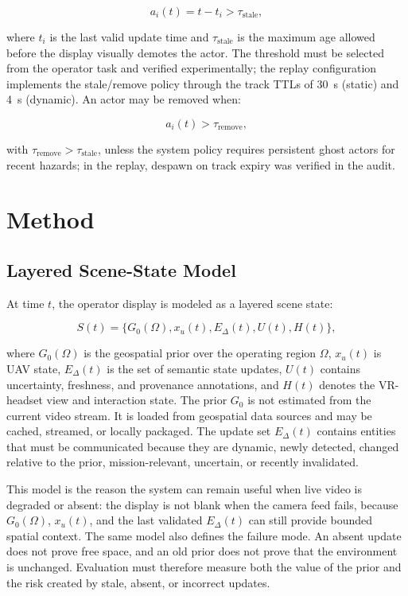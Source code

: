 \documentclass[fleqn]{VRIH2025}
\begin{document}
\begin{equation}
a_i(t) = t - t_i > \tau_{\mathrm{stale}},
\label{eq:stale}
\end{equation}

where \(t_i\) is the last valid update time and \(\tau_{\mathrm{stale}}\) is the maximum age allowed before the display visually demotes the actor. The threshold must be selected from the operator task and verified experimentally; the replay configuration implements the stale/remove policy through the track TTLs of 30~s (static) and 4~s (dynamic). An actor may be removed when:

\begin{equation}
a_i(t) > \tau_{\mathrm{remove}},
\label{eq:remove}
\end{equation}

with \(\tau_{\mathrm{remove}} > \tau_{\mathrm{stale}}\), unless the system policy requires persistent ghost actors for recent hazards; in the replay, despawn on track expiry was verified in the audit.

\section{Method}

\subsection{Layered Scene-State Model}

At time \(t\), the operator display is modeled as a layered scene state:

\begin{equation}
S(t) = \{G_0(\Omega), x_u(t), E_{\Delta}(t), U(t), H(t)\},
\label{eq:scene-state}
\end{equation}

where \(G_0(\Omega)\) is the geospatial prior over the operating region \(\Omega\), \(x_u(t)\) is UAV state, \(E_{\Delta}(t)\) is the set of semantic state updates, \(U(t)\) contains uncertainty, freshness, and provenance annotations, and \(H(t)\) denotes the VR-headset view and interaction state. The prior \(G_0\) is not estimated from the current video stream. It is loaded from geospatial data sources and may be cached, streamed, or locally packaged. The update set \(E_{\Delta}(t)\) contains entities that must be communicated because they are dynamic, newly detected, changed relative to the prior, mission-relevant, uncertain, or recently invalidated.

This model is the reason the system can remain useful when live video is degraded or absent: the display is not blank when the camera feed fails, because \(G_0(\Omega)\), \(x_u(t)\), and the last validated \(E_{\Delta}(t)\) can still provide bounded spatial context. The same model also defines the failure mode. An absent update does not prove free space, and an old prior does not prove that the environment is unchanged. Evaluation must therefore measure both the value of the prior and the risk created by stale, absent, or incorrect updates.
\end{document}

